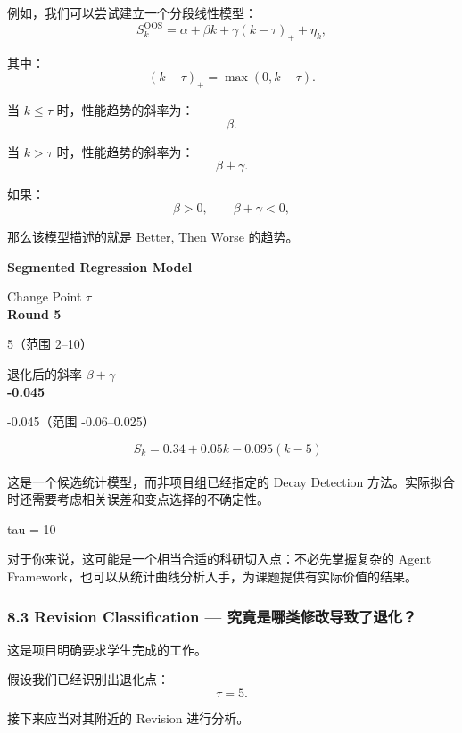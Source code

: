 例如，我们可以尝试建立一个分段线性模型：
\[S_k^{\mathrm{OOS}}
=
\alpha+\beta k+\gamma(k-\tau)_+
+\eta_k,\]

其中：
\[(k-\tau)_+=\max(0,k-\tau).\]

当 \(k\leq\tau\) 时，性能趋势的斜率为：
\[\beta.\]

当 \(k>\tau\) 时，性能趋势的斜率为：
\[\beta+\gamma.\]

如果：
\[\beta>0,
\qquad
\beta+\gamma<0,\]

那么该模型描述的就是 Better, Then Worse 的趋势。

\textbf{Segmented Regression Model}

Change Point \(\tau\)\\
\textbf{Round 5}

5（范围 2--10）

退化后的斜率 \(\beta+\gamma\)\\
\textbf{-0.045}

-0.045（范围 -0.06--0.025）


\[S_k=0.34+0.05k-0.095(k-5)_+\]

这是一个候选统计模型，而非项目组已经指定的 Decay Detection 方法。实际拟合时还需要考虑相关误差和变点选择的不确定性。

tau = 10


对于你来说，这可能是一个相当合适的科研切入点：不必先掌握复杂的 Agent Framework，也可以从统计曲线分析入手，为课题提供有实际价值的结果。

\hypertarget{part-1-07-0001-revision-classification-ux7a76ux7adfux662fux54eaux7c7bux4feeux6539ux5bfcux81f4ux4e86ux9000ux5316}{%
\subsubsection{8.3 Revision Classification --- 究竟是哪类修改导致了退化？}\label{part-1-07-0001-revision-classification-ux7a76ux7adfux662fux54eaux7c7bux4feeux6539ux5bfcux81f4ux4e86ux9000ux5316}}

这是项目明确要求学生完成的工作。

假设我们已经识别出退化点：
\[\tau=5.\]

接下来应当对其附近的 Revision 进行分析。

